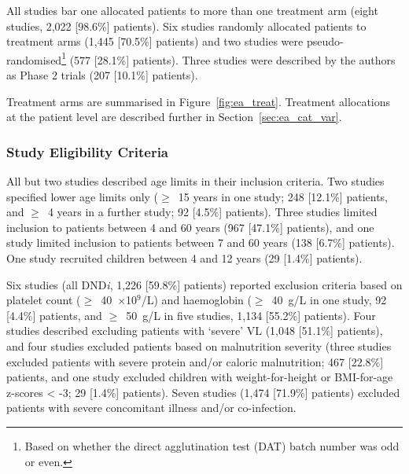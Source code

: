 All studies bar one allocated patients to more than one treatment arm (eight studies, 2,022 [98.6\%] patients)\cite{hailu2010,musa2010,musa2012,khalil2014,ritmeijer2006,ritmeijer2001,veeken2000,wasunna2016}. Six studies randomly allocated patients to treatment arms (1,445 [70.5\%] patients)\cite{hailu2010,khalil2014,musa2010,musa2012,ritmeijer2006,wasunna2016} and two studies were pseudo-randomised\footnote{Based on whether the direct agglutination test (DAT) batch number was odd or even.} (577 [28.1\%] patients)\cite{ritmeijer2001,veeken2000}. Three studies were described by the authors as Phase 2 trials (207 [10.1\%] patients)\cite{mbui2019,musa2010,wasunna2016}.

Treatment arms are summarised in Figure~\ref{fig:ea_treat}. Treatment allocations at the patient level are described further in Section~\ref{sec:ea_cat_var}.

\subsubsection{Study Eligibility Criteria}

All but two studies described age limits in their inclusion criteria\cite{hailu2010,khalil2014,mbui2019,musa2010,musa2012,ritmeijer2006,wasunna2016}. Two studies specified lower age limits only ($\geq$~15 years in one study; 248 [12.1\%] patients, and $\geq$~4 years in a further study; 92 [4.5\%] patients). Three studies limited inclusion to patients between 4 and 60 years (967 [47.1\%] patients)\cite{musa2010,musa2012,hailu2010}, and one study limited inclusion to patients between 7 and 60 years (138 [6.7\%] patients)\cite{wasunna2016}. One study recruited children between 4 and 12 years (29 [1.4\%] patients)\cite{mbui2019}.

Six studies (all DND\textit{i}, 1,226 [59.8\%] patients) reported exclusion criteria based on platelet count ($\geq$~40~$\times$10$^9$/L) and haemoglobin ($\geq$~40~g/L in one study, 92 [4.4\%] patients\cite{khalil2014}, and $\geq$~50~g/L in five studies, 1,134 [55.2\%] patients\cite{hailu2010,mbui2019,musa2010,musa2012,wasunna2016}). Four studies described excluding patients with `severe' VL (1,048 [51.1\%] patients)\cite{hailu2010,khalil2014,mbui2019,musa2012}, and four studies excluded patients based on malnutrition severity (three studies excluded patients with severe protein and/or caloric malnutrition; 467 [22.8\%] patients\cite{hailu2010,musa2010,wasunna2016}, and one study excluded children with weight-for-height or BMI-for-age z-scores < -3; 29 [1.4\%] patients\cite{mbui2019}). Seven studies (1,474 [71.9\%] patients) excluded patients with severe concomitant illness and/or co-infection\cite{hailu2010,khalil2014,mbui2019,musa2010,musa2012,ritmeijer2006,wasunna2016}.

